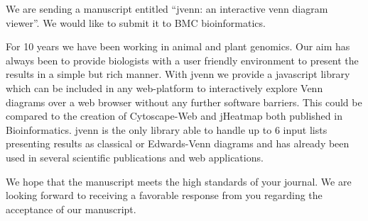 \documentclass[10pt,stdletter,dateno,sigleft]{newlfm} %
\begin{document}
\begin{newlfm}


We are sending a manuscript entitled “jvenn: an interactive venn diagram viewer”.
We would like to submit it to BMC bioinformatics.

For 10 years we have been working in animal and plant genomics. Our aim has always been to provide biologists with a user friendly environment 
to present the results in a simple but rich manner. With jvenn we provide a javascript library which can be included in any web-platform to 
interactively explore Venn diagrams over a web browser without any further software barriers. This could be compared to the creation of Cytoscape-Web 
and jHeatmap both published in Bioinformatics. jvenn is the only library able to handle up to 6 input lists presenting results as classical or 
Edwards-Venn diagrams and has already been used in several scientific publications and web applications. 

We hope that the manuscript meets the high standards of your journal. 
We are looking forward to receiving a favorable response from you regarding the acceptance of our manuscript.


\end{newlfm}
\end{document}
